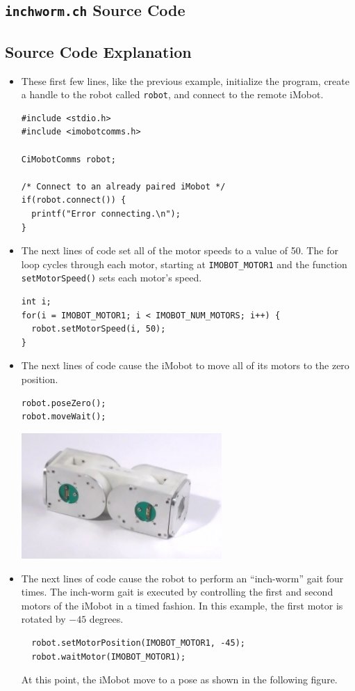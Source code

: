 \documentclass[11pt]{report}
\begin{document}
\subsection{\texttt{inchworm.ch} Source Code}

\subsection{Source Code Explanation}
\begin{itemize}
\item
These first few lines, like the previous example, initialize the program,
create a handle to the robot called \texttt{robot}, and connect to the remote
iMobot.

\begin{verbatim}
#include <stdio.h>
#include <imobotcomms.h>

CiMobotComms robot;

/* Connect to an already paired iMobot */
if(robot.connect()) {
  printf("Error connecting.\n");
}
\end{verbatim}

\item
The next lines of code set all of the motor speeds to a value of 50. The for loop
cycles through each motor, starting at \texttt{IMOBOT\_MOTOR1} and the function
\texttt{setMotorSpeed()} sets each motor's speed.
\begin{verbatim}
int i;
for(i = IMOBOT_MOTOR1; i < IMOBOT_NUM_MOTORS; i++) {
  robot.setMotorSpeed(i, 50);
}
\end{verbatim}

\item
The next lines of code cause the iMobot to move all of its motors to the zero position.
\begin{verbatim}
robot.poseZero();
robot.moveWait();
\end{verbatim}

\includegraphics[width=3in]{images/inch1.png}

\item
The next lines of code cause the robot to perform an ``inch-worm'' gait four
times. The inch-worm gait is executed by controlling the first and second motors of the iMobot in a timed fashion. In this example, the first motor is rotated by $-45$ degrees.
\begin{verbatim}
  robot.setMotorPosition(IMOBOT_MOTOR1, -45);
  robot.waitMotor(IMOBOT_MOTOR1);
\end{verbatim}
At this point, the iMobot move to a pose as shown in the following figure.


\end{itemize}
\end{document}
